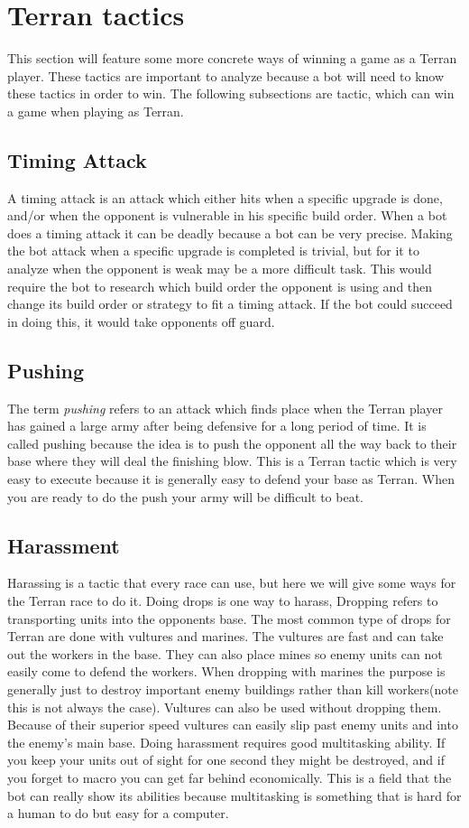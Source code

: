 \section{Terran tactics}
	This section will feature some more concrete ways of winning a game as a Terran player. 
	These tactics are important to analyze because a bot will need to know these tactics in order to win.
	The following subsections are tactic, which can win a game when playing as Terran.
	
	\subsection{Timing Attack}
		A timing attack is an attack which either hits when a specific upgrade is done, and/or when the opponent is vulnerable in his specific build order. 
		When a bot does a timing attack it can be deadly because a bot can be very precise. Making the bot attack when a specific upgrade is completed is trivial, but for it to 
		analyze when the opponent is weak may be a more difficult task. This would require the bot to research which build order the opponent is using and 
		then change its build order or strategy to fit a timing attack. If the bot could succeed in doing this, it would take opponents off guard.
		
	\subsection{Pushing}
		The term \textit{pushing} refers to an attack which finds place when the Terran player has gained a large army after being defensive for a long 
		period of time. It is called pushing because the idea is to push the opponent 
		all the way back to their base where they will deal the finishing blow. This is a Terran tactic which is very easy to execute because it is generally
		easy to defend your base as Terran. When you are ready to do the push your army will be difficult to beat.
		
	\subsection{Harassment}
		Harassing is a tactic that every race can use, but here we will give some ways for the Terran race to do it. Doing drops is one way to harass, Dropping 
		refers to transporting units into the opponents base. The most common type of drops for Terran are done with vultures and marines. The vultures are 
		fast and can take out the workers in the base. They can also place mines so enemy units can not easily come to defend the workers. When dropping with marines 
		the purpose is generally just to destroy important enemy buildings rather than kill workers(note this is not always the case). Vultures can also be used without 
		dropping them. Because of their superior speed vultures can easily slip past enemy units and into the enemy's main base. Doing harassment requires 
		good multitasking ability. If you keep your units out of sight for one second they might be destroyed, and if you forget to macro you can 
		get far behind economically. This is a field that the bot can really show its abilities because multitasking is something that is hard for a human to do but 
		easy for a computer.
	
